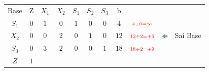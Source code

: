 \begin{frame}
{\begin{table}
\begin{tabular}{c c c c c c c c c c c}
			\end{tabular}
		\end{table}			
	}	
	{		
		\begin{table}		
			\begin{tabular}{c c c c c c c c c c c}
				\cline{1-8} 
				\cellcolor{blue!100} \color{white} \scriptsize Base 
				&\cellcolor{blue!100} \color{white} \scriptsize Z 
				&\cellcolor{blue!100} \color{white} $\scriptstyle X_1$ 
				&\cellcolor{blue!100} \color{red} $\scriptstyle X_2$ 
				&\cellcolor{blue!100} \color{red} $\scriptstyle S_1$ 
				&\cellcolor{blue!100} \color{white} $\scriptstyle S_2$ 
				&\cellcolor{blue!100} \color{red} $\scriptstyle S_3$ 
				&\cellcolor{blue!100} \color{white} \scriptsize b
				&
				&
				& \\
				\cline{1-8}
				\cellcolor{blue!100} \color{red} $\scriptstyle S_1$
				& \cellcolor{yellow!50} $\scriptstyle 0$
				& \cellcolor{yellow!50} $\scriptstyle 1$
				& \cellcolor{gray!50} $\scriptstyle 0$
				& \cellcolor{yellow!50} $\scriptstyle 1$
				& \cellcolor{yellow!50} $\scriptstyle 0$
				& \cellcolor{yellow!50} $\scriptstyle 0$
				& \cellcolor{gray!50} $\scriptstyle 4$
				& $ \scriptstyle \color{red} 4 \div 0 = \infty $
				&
				& \\
				\cline{1-8} 
				\cellcolor{blue!100} \color{red} $\scriptstyle X_2$
				& \cellcolor{gray!50} $\scriptstyle 0$
				& \cellcolor{gray!50} $\scriptstyle 0$
				& \cellcolor{red!50} $\scriptstyle 2$
				& \cellcolor{gray!50} $\scriptstyle 0$			
				& \cellcolor{gray!50} $\scriptstyle 1$
				& \cellcolor{gray!50} $\scriptstyle 0$
				& \cellcolor{gray!50} $\scriptstyle 12$
				& $ \scriptstyle \color{red} 12 \div 2 = +6 $
				& \scriptsize \includegraphics[width=0.3cm,height=0.2cm]{setaesquerda.jpg}
				& \scriptsize \color{red} Sai Base \\
				\cline{1-8} 
				\cellcolor{blue!100} \color{red} $\scriptstyle S_3$
				& \cellcolor{yellow!50} $\scriptstyle 0$
				& \cellcolor{yellow!50} $\scriptstyle 3$
				& \cellcolor{gray!50} $\scriptstyle 2$
				& \cellcolor{yellow!50} $\scriptstyle 0$
				& \cellcolor{yellow!50} $\scriptstyle 0$
				& \cellcolor{yellow!50} $\scriptstyle 1$
				& \cellcolor{gray!50} $\scriptstyle 18$
				& $ \scriptstyle \color{red} 18 \div 2 = +9 $
				&
				& \\
				\cline{1-8}
				\cellcolor{blue!100} \color{white} $\scriptstyle Z$
				& \cellcolor{yellow!50} $\scriptstyle 1$

\end{tabular}
\end{table}}
\end{frame}
